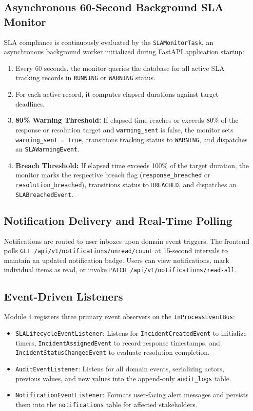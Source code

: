 \documentclass[11pt,a4paper,oneside]{report}
\begin{document}
\subsection{Asynchronous 60-Second Background SLA Monitor}
SLA compliance is continuously evaluated by the \texttt{SLAMonitorTask}, an asynchronous background worker initialized during FastAPI application startup:
\begin{enumerate}
    \item Every 60 seconds, the monitor queries the database for all active SLA tracking records in \texttt{RUNNING} or \texttt{WARNING} status.
    \item For each active record, it computes elapsed durations against target deadlines.
    \item \textbf{80\% Warning Threshold:} If elapsed time reaches or exceeds 80\% of the response or resolution target and \texttt{warning\_sent} is false, the monitor sets \texttt{warning\_sent = true}, transitions tracking status to \texttt{WARNING}, and dispatches an \texttt{SLAWarningEvent}.
    \item \textbf{Breach Threshold:} If elapsed time exceeds 100\% of the target duration, the monitor marks the respective breach flag (\texttt{response\_breached} or \texttt{resolution\_breached}), transitions status to \texttt{BREACHED}, and dispatches an \texttt{SLABreachedEvent}.
\end{enumerate}

\subsection{Notification Delivery and Real-Time Polling}
Notifications are routed to user inboxes upon domain event triggers. The frontend polls \texttt{GET /api/v1/notifications/unread/count} at 15-second intervals to maintain an updated notification badge. Users can view notifications, mark individual items as read, or invoke \texttt{PATCH /api/v1/notifications/read-all}.

\subsection{Event-Driven Listeners}
Module 4 registers three primary event observers on the \texttt{InProcessEventBus}:
\begin{itemize}
    \item \texttt{SLALifecycleEventListener}: Listens for \texttt{IncidentCreatedEvent} to initialize timers, \texttt{IncidentAssignedEvent} to record response timestamps, and \texttt{IncidentStatusChangedEvent} to evaluate resolution completion.
    \item \texttt{AuditEventListener}: Listens for all domain events, serializing actors, previous values, and new values into the append-only \texttt{audit\_logs} table.
    \item \texttt{NotificationEventListener}: Formats user-facing alert messages and persists them into the \texttt{notifications} table for affected stakeholders.
\end{itemize}
\end{document}
